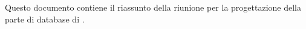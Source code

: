 Questo documento contiene il riassunto della riunione per la progettazione della parte di database di \progetto.

